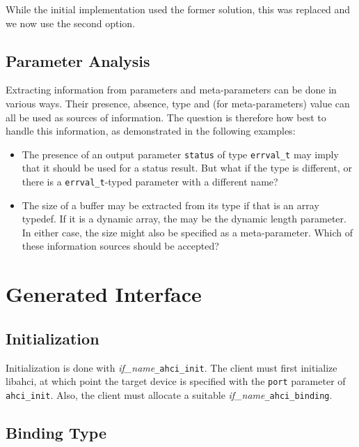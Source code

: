 While the initial implementation used the former solution, this was replaced
and we now use the second option.

\subsection{Parameter Analysis}

Extracting information from parameters and meta-parameters can be done in
various ways. Their presence, absence, type and (for meta-parameters) value can
all be used as sources of information. The question is therefore how best to
handle this information, as demonstrated in the following examples:

\begin{itemize}

	\item The presence of an output parameter \lstinline+status+ of type
		\lstinline+errval_t+ may imply that it should be used for a status
		result. But what if the type is different, or there is a
		\lstinline+errval_t+-typed parameter with a different name?

	\item The size of a buffer may be extracted from its type if that is an
		array typedef. If it is a dynamic array, the may be the dynamic length
		parameter. In either case, the size might also be specified as a
		meta-parameter. Which of these information sources should be accepted?

\end{itemize}

\section{Generated Interface}
\newcommand{\flifname}{\textit{if\_name}}
\newcommand{\flahcib}{\flifname\lstinline+_ahci_binding+\xspace}

\subsection{Initialization}

Initialization is done with \flifname\lstinline+_ahci_init+. The client must
first initialize libahci, at which point the target device is specified with
the \lstinline+port+ parameter of \lstinline+ahci_init+. Also, the client must
allocate a suitable \flahcib.

\subsection{Binding Type}

